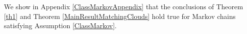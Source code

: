 \documentclass[11pt,a4paper,oneside]{amsart}
\numberwithin{equation}{section}
\newcommand{\dd}{\mathrm{d}}
\newcommand{\LL}{\mathrm{L}}
\newcommand{\nc}[1]{\textcolor{red}{[N: #1]}}
\newcommand{\m}{\mathrm{m}}
\begin{document}
\medskip
We show in Appendix \ref{ClassMarkovAppendix} that the conclusions of Theorem \ref{th1} and Theorem \ref{MainResultMatchingClouds} hold true for Markov chains satisfying Assumption \ref{ClassMarkov}.
%
%
%
%
%
%
%
%

%
%

%
%
%
%

%
%

%
%
%
\end{document}
